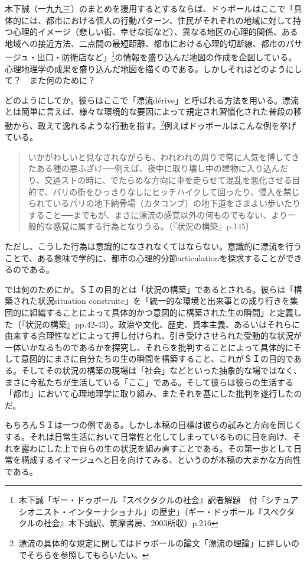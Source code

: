 \documentclass[b5j,twoside,twocolumn]{utarticle}
\begin{document}
木下誠（一九九三）のまとめを援用するとするならば、ドゥボールはここで「具体的には、都市における個人の行動パターン、住民がそれぞれの地域に対して持つ心理的イメージ（悲しい街、幸せな街など）、異なる地区の心理的関係、ある地域への接近方法、二点間の最短距離、都市における心理的切断線、都市のパサージュ・出口・防衛店など」\footnote{木下誠「ギー・ドゥボール『スペクタクルの社会』訳者解題　付「シチュアシオニスト・インターナショナル」の歴史」（ギー・ドゥボール『スペクタクルの社会』木下誠訳、筑摩書房、2003所収）p.216}の情報を盛り込んだ地図の作成を企図している。心理地理学の成果を盛り込んだ地図を描くのである。しかしそれはどのようにして？　また何のために？


どのようにしてか。彼らはここで「漂流dérive」と呼ばれる方法を用いる。漂流とは簡単に言えば、様々な環境的な要因によって規定され習慣化された普段の移動から、敢えて逸れるような行動を指す。\footnote{漂流の具体的な規定に関してはドゥボールの論文「漂流の理論」に詳しいのでそちらを参照してもらいたい。}例えばドゥボールはこんな例を挙げている。
\begin{quote}
いかがわしいと見なされながらも、われわれの周りで常に人気を博してきたある種の悪ふざけ──例えば、夜中に取り壊し中の建物に入り込んだり、交通ストの時に、でたらめな方向に車を走らせて混乱を悪化させる目的で、パリの街をひっきりなしにヒッチハイクして回ったり、侵入を禁じられているパリの地下納骨場（カタコンブ）の地下道をさまよい歩いたりすること──までもが、まさに漂流の感覚以外の何ものでもない、より一般的な感覚に属する行為となりうる。（『状況の構築』p.145）
\end{quote}
ただし、こうした行為は意識的になされなくてはならない。意識的に漂流を行うことで、ある意味で学的に、都市の心理的分節articulationを探求することができるのである。


では何のためにか。ＳＩの目的とは「状況の構築」であるとされる。彼らは「構築された状況situation construite」を「統一的な環境と出来事との成り行きを集団的に組織することによって具体的かつ意図的に構築された生の瞬間」と定義した（『状況の構築』pp.42-43）。政治や文化、歴史、資本主義、あるいはそれらに由来する合理性などによって押し付けられ、引き受けさせられた受動的な状況が一体いかなるものであるかを探究し、それらを批判することによって具体的にそして意図的にまさに自分たちの生の瞬間を構築すること、これがＳＩの目的である。そしてその状況の構築の現場は「社会」などといった抽象的な場ではなく、まさに今私たちが生活している「ここ」である。そして彼らは彼らの生活する「都市」において心理地理学に取り組み、またそれを基にした批判を遂行したのだ。


もちろんＳＩは一つの例である。しかし本稿の目標は彼らの試みと方向を同じくする。それは日常生活において日常性と化してしまっているものに目を向け、それを露わにした上で自らの生の状況を組み直すことである。その第一歩として日常を構成するイマージュへと目を向けてみる、というのが本稿の大まかな方向性である。
\end{document}
